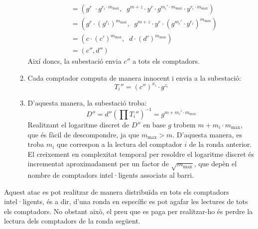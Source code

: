 \begin{enumerate}
\begin{enumerate}
\begin{align*}
		&= ( g^r \; \cdot g^{r_i \cdot m_{\textrm{max}}} , \;\; g^{m + z} \cdot y^r \cdot g^{m_i' \cdot m_{\textrm{max}}} \cdot y^{r_i \cdot m_{\textrm{max}}} )\\
		&= (g^r \cdot (g^{r_i})^{m_{\textrm{max}}}, \;\; g^{m + z} \cdot y^r \cdot (g^{m_i'} \cdot y^{r_i})^{m_{\textrm{max}}} )\\
		&=(c \cdot (c')^{m_{\textrm{max}}}, \;\; d \cdot (d')^{m_{\textrm{max}}})\\
		&=(c'', d'')
		\end{align*}
		Així doncs, la subestació envia $c''$ a tots els comptadors.
		\item Cada comptador computa de manera innocent i envia a la subestació:
		\[T_i'' = (c'')^{x_i} \cdot g^{z_i}\]
		\item D'aquesta manera, la subestació troba:
		\[D'' = d'' (\prod T_i'')^{-1} = g^{m + m_i' \cdot m_{\textrm{max}}}\]
		Realitzant el logaritme discret de $D''$ en base $g$ trobem $m + m_i \cdot m_{\textrm{max}}$, que és fàcil de descompondre, ja que $m_{\textrm{max}} > m$. D'aquesta manera, es troba $m_i$ que correspon a la lectura del comptador $i$ de la ronda anterior.\\
		El creixement en complexitat temporal per resoldre el logaritme discret és incrementat aproximadament per un factor de $\sqrt{m_{\textrm{max}}} $, que depèn el nombre de comptadors intel·ligents associats al barri.
	\end{enumerate}
\end{enumerate}
Aquest atac es pot realitzar de manera distribuïda en tots els comptadors intel·ligents, és a dir, d'una ronda en específic es pot agafar les lectures de tots els comptadors. No obstant això, el preu que es paga per realitzar-ho és perdre la lectura dels comptadors de la ronda següent.
